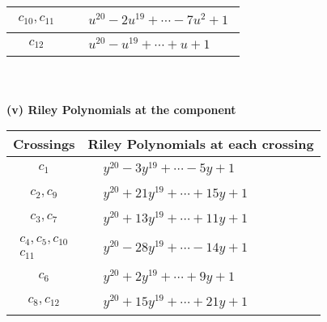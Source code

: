 \documentclass[1p]{elsarticle_modified}
\theoremstyle{definition}
\begin{document}
\begin{tabular}{m{50pt}|m{274pt}}
\hline $$\begin{aligned}c_{10},c_{11}\end{aligned}$$&$\begin{aligned}
&u^{20}-2 u^{19}+\cdots-7 u^2+1
\end{aligned}$\\
\hline $$\begin{aligned}c_{12}\end{aligned}$$&$\begin{aligned}
&u^{20}- u^{19}+\cdots+u+1
\end{aligned}$\\
\hline
\end{tabular}\\~\\
\newpage\renewcommand{\arraystretch}{1}
\flushleft \textbf{(v) Riley Polynomials at the component}\newline \\
\begin{tabular}{m{50pt}|m{274pt}}
Crossings & \hspace{64pt}Riley Polynomials at each crossing \\
\hline $$\begin{aligned}c_{1}\end{aligned}$$&$\begin{aligned}
&y^{20}-3 y^{19}+\cdots-5 y+1
\end{aligned}$\\
\hline $$\begin{aligned}c_{2},c_{9}\end{aligned}$$&$\begin{aligned}
&y^{20}+21 y^{19}+\cdots+15 y+1
\end{aligned}$\\
\hline $$\begin{aligned}c_{3},c_{7}\end{aligned}$$&$\begin{aligned}
&y^{20}+13 y^{19}+\cdots+11 y+1
\end{aligned}$\\
\hline $$\begin{aligned}c_{4},c_{5},c_{10}\\c_{11}\end{aligned}$$&$\begin{aligned}
&y^{20}-28 y^{19}+\cdots-14 y+1
\end{aligned}$\\
\hline $$\begin{aligned}c_{6}\end{aligned}$$&$\begin{aligned}
&y^{20}+2 y^{19}+\cdots+9 y+1
\end{aligned}$\\
\hline $$\begin{aligned}c_{8},c_{12}\end{aligned}$$&$\begin{aligned}
&y^{20}+15 y^{19}+\cdots+21 y+1
\end{aligned}$\\
\hline
\end{tabular}\\~\\
\end{document}
